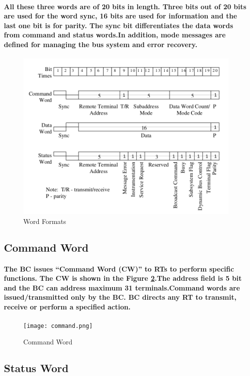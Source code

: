 \documentclass[12pt,a4paper]{report}
\begin{document}
\paragraph{\textrm{\textmd {All these three words are of 20 bits in length. Three bits out of 20 bits are used for the word sync, 16 bits are used for information and the last one bit is for parity. The sync bit differentiates the data words from command and status words.In addition, mode messages are defined for managing the bus system and error recovery.}}}
\begin{figure}[h]
	\centering
	\includegraphics[scale=.35]{word.png}
	\caption{Word Formats}
	\label{fig:word}
\end{figure}
\subsection{Command Word}
\paragraph{\textrm{\textmd{ The BC issues “Command Word (CW)” to RTs to perform specific functions. The CW is shown in the Figure \ref{fig:cmd}.The address field is 5 bit and the BC can address maximum 31 terminals.Command words are issued/transmitted only by the BC. BC directs any RT to transmit, receive or perform a specified action.}}}
\begin{figure}[h]
	\centering
	\texttt{[image: command.png]}
	\caption{Command Word}
	\label{fig:cmd}
\end{figure}
\subsection{Status Word}
\end{document}
